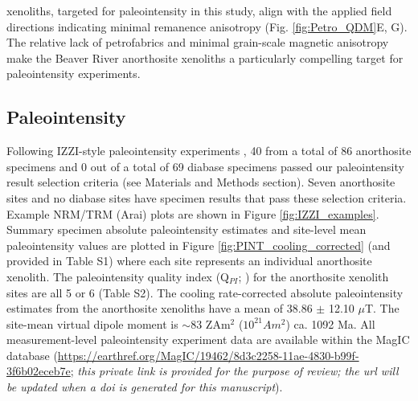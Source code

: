 \documentclass[9pt,twocolumn,twoside,lineno]{pnas-new}
\begin{document}
xenoliths, targeted for paleointensity in this study, align with the applied field directions indicating minimal remanence anisotropy  (Fig. \ref{fig:Petro_QDM}E, G). The relative lack of petrofabrics and minimal grain-scale magnetic anisotropy make the Beaver River anorthosite xenoliths a particularly compelling target for paleointensity experiments.




\subsection*{Paleointensity}

Following IZZI-style paleointensity experiments \cite{Yu2004a}, 40 from a total of 86 anorthosite specimens and 0 out of a total of 69 diabase specimens passed our paleointensity result selection criteria (see Materials and Methods section). Seven anorthosite sites and no diabase sites have specimen results that pass these selection criteria. Example NRM/TRM (Arai) plots are shown in Figure \ref{fig:IZZI_examples}. Summary specimen absolute paleointensity estimates and site-level mean paleointensity values are plotted in Figure \ref{fig:PINT_cooling_corrected} (and provided in Table S1) where each site represents an individual anorthosite xenolith. The paleointensity quality index (Q$_{PI}$; \citealp{Biggin2014a}) for the anorthosite xenolith sites are all 5 or 6 (Table S2). The cooling rate-corrected absolute paleointensity estimates from the anorthosite xenoliths have a mean of 38.86 $\pm$ 12.10 $\mu$T. The site-mean virtual dipole moment is $\sim$83 ZAm$^2$ ($10^{21} Am^2$) ca. 1092 Ma. All measurement-level paleointensity experiment data are available within the MagIC database (\url{https://earthref.org/MagIC/19462/8d3c2258-11ae-4830-b99f-3f6b02eceb7e}; \textit{this private link is provided for the purpose of review; the url will be updated when a doi is generated for this manuscript}). 
\end{document}
